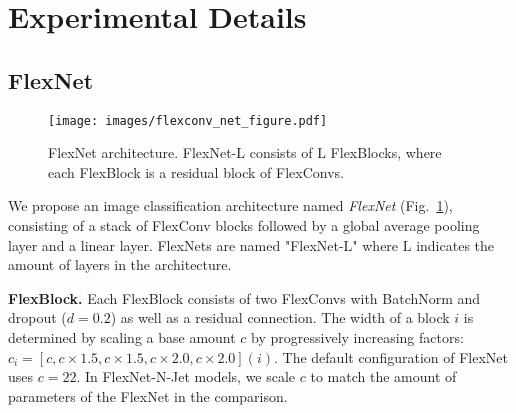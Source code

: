 \documentclass{article} \usepackage{iclr2022_conference,times}
\begin{document}
\begin{table}
\centering
\caption{Results on STL-10. We train each model with three different seeds and report mean and standard deviation. *Results are taken from \citet{luo2020extended}. \dagger Results are from single run.}
\label{tab:stl10}
\begin{center}
\end{center}
\end{table}

\section{Experimental Details}

\subsection{FlexNet}
\label{sec:appx-flexnet}

\begin{figure}[t]
    \centering
    \texttt{[image: images/flexconv\_net\_figure.pdf]}
    \vspace{-5mm}
    \caption{FlexNet architecture. FlexNet-$\mathrm{L}$ consists of $\mathrm{L}$ FlexBlocks, where each FlexBlock is a residual block of FlexConvs.}
    \label{fig:flexnet-architecture}
    \vspace{-5mm}
\end{figure}

We propose an image classification architecture named \textit{FlexNet} (Fig.~\ref{fig:flexnet-architecture}), consisting of a stack of FlexConv blocks followed by a global average pooling layer and a linear layer. FlexNets are named "FlexNet-$\mathrm{L}$" where $\mathrm{L}$ indicates the amount of layers in the architecture.

\textbf{FlexBlock.} Each FlexBlock consists of two FlexConvs with BatchNorm \citep{ioffe2015batch} and dropout \citep{srivastava14a} ($d = 0.2$) as well as a residual connection. The width of a block $i$ is determined by scaling a base amount $c$ by progressively increasing factors: $c_i = [c, c \times 1.5, c \times 1.5, c \times 2.0, c \times 2.0](i)$. The default configuration of FlexNet uses $c = 22$. In FlexNet-N-Jet models, we scale $c$ to match the amount of parameters of the FlexNet in the comparison.
\end{document}
